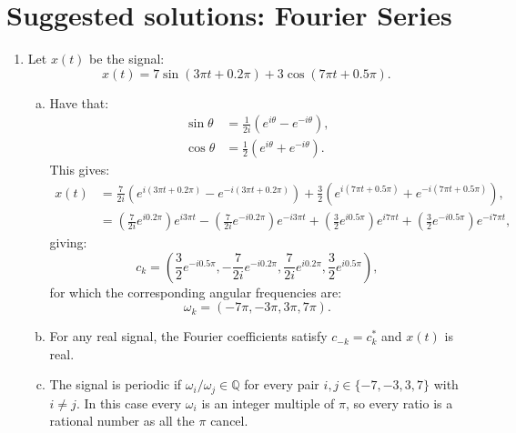 
\newpage
\section{Suggested solutions: Fourier Series}

\begin{enumerate}
  \item Let $x(t)$ be the signal:
        \[ x(t) = 7\sin(3\pi t+0.2\pi) + 3\cos(7\pi t+0.5\pi). \]

        \begin{enumerate}[a)]
          \item Have that:
                \begin{align*}
                  \sin\theta & =\frac{1}{2i}(e^{i\theta}-e^{-i\theta}), \\
                  \cos\theta & =\frac{1}{2}(e^{i\theta}+e^{-i\theta}).
                \end{align*}
                This gives:
                \begin{align*}
                  x(t) & = \frac{7}{2i}(e^{i(3\pi t+0.2\pi)}-e^{-i(3\pi t+0.2\pi)})+ \frac{3}{2}(e^{i(7\pi t+0.5\pi)}+e^{-i(7\pi t+0.5\pi)}),                                                                                   \\
                       & = \left(\frac{7}{2i}e^{i0.2\pi}\right)e^{i3\pi t}-\left(\frac{7}{2i}e^{-i0.2\pi}\right)e^{-i3\pi t} + \left(\frac{3}{2}e^{i0.5\pi}\right)e^{i7\pi t}+\left(\frac{3}{2}e^{-i0.5\pi}\right)e^{-i7\pi t},
                \end{align*}
                giving:
                \[ c_{k} = \left(\frac{3}{2}e^{-i0.5\pi},-\frac{7}{2i}e^{-i0.2\pi},\frac{7}{2i}e^{i0.2\pi},\frac{3}{2}e^{i0.5\pi}\right), \]
                for which the corresponding angular frequencies are:
                \[ \omega_{k}=(-7\pi,-3\pi,3\pi,7\pi). \]

          \item For any real signal, the Fourier coefficients satisfy $c_{-k}=c_{k}^{*}$ and $x(t)$ is real.

          \item The signal is periodic if $\omega_{i}/\omega_{j}\in\mathbb{Q}$ for every 
                pair $i,j\in \{-7,-3,3,7\}$ with $i\neq j$. In this case every $\omega_{i}$ is an 
                integer multiple of $\pi$, so every ratio is a rational number as all the $\pi$ cancel.


\end{enumerate}
\end{enumerate}
